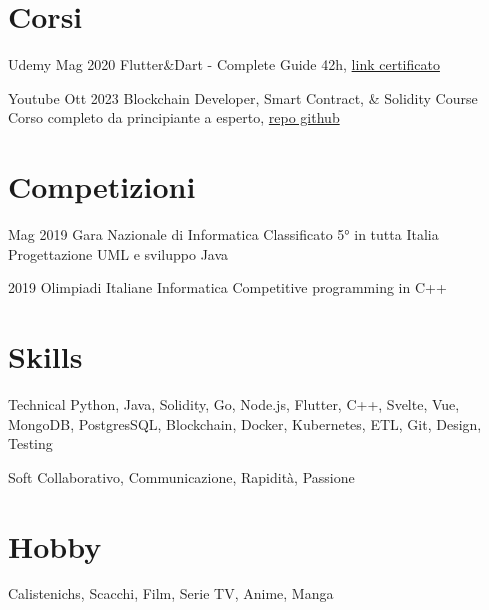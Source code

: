 \documentclass{tccv}
\begin{document}
\section{Corsi}

\begin{yearlist}

\item[Udemy]{Mag 2020}
     {Flutter\&Dart - Complete Guide}
     {42h, \href{https://www.udemy.com/certificate/UC-c6f5a32f-babc-42f9-8a0a-6effadf9e7cd/}{link certificato}}

\item[Youtube]{Ott 2023}
    {Blockchain Developer, Smart Contract, \& Solidity Course}
    {Corso completo da principiante a esperto, \href{https://github.com/Cyfrin/foundry-full-course-f23}{repo github}}

\end{yearlist}


\section{Competizioni}

\begin{yearlist}

\item[]{Mag 2019}
     {Gara Nazionale di Informatica}
     {Classificato 5° in tutta Italia \newline
     Progettazione UML e sviluppo Java}

\item[]{2019}
    {Olimpiadi Italiane Informatica}
    {Competitive programming in C++}

\end{yearlist}


\section{Skills}

\begin{factlist}

\item{Technical}
     {Python, Java, Solidity, Go, Node.js, Flutter, C++, Svelte, Vue, MongoDB, PostgresSQL, Blockchain, Docker, Kubernetes, ETL, Git, Design, Testing}

\item{Soft}
     {Collaborativo, Communicazione, Rapidità, Passione}

\end{factlist}


\section{Hobby}

Calistenichs, Scacchi, Film, Serie TV, Anime, Manga
\end{document}
